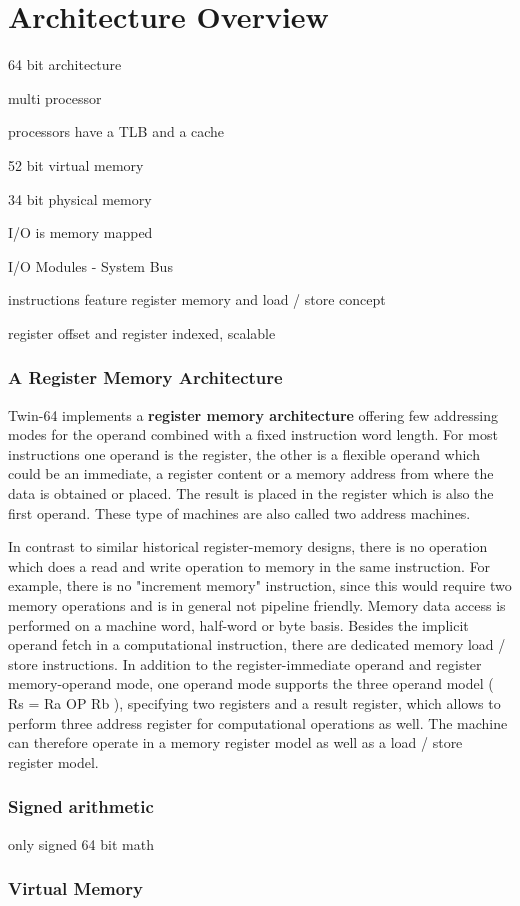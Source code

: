 %
%
\chapter*{Architecture Overview}

64 bit architecture



multi processor 

processors have a TLB and a cache

52 bit virtual memory

34 bit physical memory

I/O is memory mapped

I/O Modules - System Bus

instructions feature register memory and load / store concept

register offset and register indexed, scalable




\subsection*{A Register Memory Architecture}

Twin-64 implements a \textbf{register memory architecture} offering few addressing modes for the operand combined with a fixed instruction word length. For most instructions one operand is the register, the other is a flexible operand which could be an immediate, a register content or a memory address from where the data is obtained or placed. The result is placed in the register which is also the first operand. These type of machines are also called two address machines.

In contrast to similar historical register-memory designs, there is no operation which does a read and write operation to memory in the same instruction. For example, there is no "increment memory" instruction, since this would require two memory operations and is in general not pipeline friendly. Memory data access is performed on a machine word, half-word or byte basis. Besides the implicit operand fetch in a computational instruction, there are dedicated memory load / store instructions. In addition to the register-immediate operand and register memory-operand mode, one operand mode supports the three operand model ( Rs = Ra OP Rb ), specifying two registers and a result register, which allows to perform three address register for computational operations as well. The machine can therefore operate in a memory register model as well as a load / store register model.

\subsection*{Signed arithmetic}


only signed 64 bit math

\subsection*{Virtual Memory}




